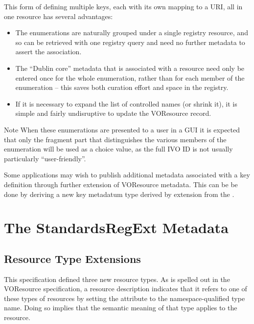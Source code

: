 \documentclass[11pt,a4paper]{ivoa}
\begin{document}
This form of defining multiple keys, each with its own mapping to a
URI, all in one resource has several advantages:



\begin{itemize}

\item  The enumerations are naturally grouped under a single registry
       resource, and so can be retrieved with one registry query and
       need no further metadata to assert the association.

\item  The ``Dublin core'' metadata that is associated with a resource
       need only be entered once for the whole enumeration, rather
       than for each member of the enumeration -- this  saves both
       curation effort and space in the registry.

\item  If it is necessary to expand the list of controlled names (or
       shrink it), it is simple and fairly undisruptive to update the
       VOResource record.

\end{itemize}

\begin{admonition}{Note}
       When these enumerations are presented to a user in a GUI it is
       expected that only the fragment part that distinguishes
       the various members of the enumeration will be used as a choice
       value, as the full IVO ID is not usually particularly
       ``user-friendly''.
\end{admonition}

Some applications may wish to publish additional metadata associated
with a key definition through further extension of VOResource
metadata.  This can be be done by deriving a new key metadatum type
derived by extension from the .



\section{The StandardsRegExt Metadata}

\subsection{Resource Type Extensions}

This specification defined three new resource types.  As is spelled
out in the VOResource specification, a resource description indicates
that it refers to one of these types of resources by setting the
 attribute to the namespace-qualified type name.
Doing so implies that the semantic meaning of that type applies to the
resource.
\end{document}
